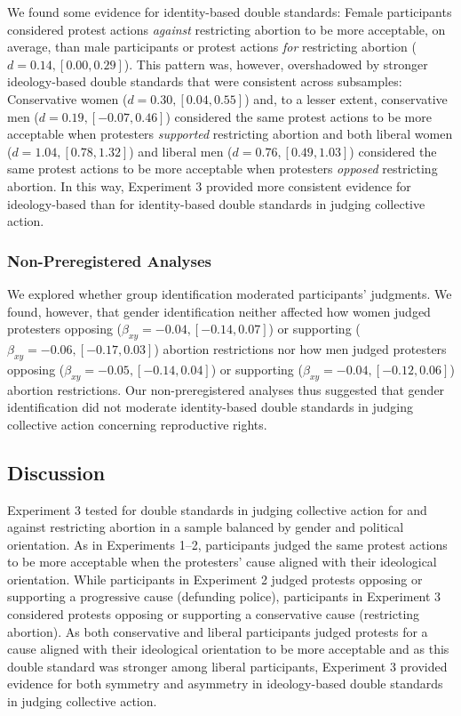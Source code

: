 \documentclass[12pt, letterpaper]{article}
\begin{document}
We found some evidence for identity-based double standards: Female
participants considered protest actions \emph{against} restricting
abortion to be more acceptable, on average, than male participants or
protest actions \emph{for} restricting abortion
(\(d = 0.14, [0.00, 0.29]\)). This pattern was, however, overshadowed by
stronger ideology-based double standards that were consistent across
subsamples: Conservative women (\(d = 0.30, [0.04, 0.55]\)) and, to a
lesser extent, conservative men (\(d = 0.19, [-0.07, 0.46]\)) considered
the same protest actions to be more acceptable when protesters
\emph{supported} restricting abortion and both liberal women
(\(d = 1.04, [0.78, 1.32]\)) and liberal men
(\(d = 0.76, [0.49, 1.03]\)) considered the same protest actions to be
more acceptable when protesters \emph{opposed} restricting abortion. In
this way, Experiment 3 provided more consistent evidence for
ideology-based than for identity-based double standards in judging
collective action.

\hypertarget{non-preregistered-analyses-2}{%
\subsubsection{Non-Preregistered
Analyses}\label{non-preregistered-analyses-2}}

We explored whether group identification moderated participants'
judgments. We found, however, that gender identification neither
affected how women judged protesters opposing
(\(\beta_{xy} = -0.04, [-0.14, 0.07]\)) or supporting
(\(\beta_{xy} = -0.06, [-0.17, 0.03]\)) abortion restrictions nor how
men judged protesters opposing (\(\beta_{xy} = -0.05, [-0.14, 0.04]\))
or supporting (\(\beta_{xy} = -0.04, [-0.12, 0.06]\)) abortion
restrictions. Our non-preregistered analyses thus suggested that gender
identification did not moderate identity-based double standards in
judging collective action concerning reproductive rights.

\hypertarget{discussion-2}{%
\subsection{Discussion}\label{discussion-2}}

Experiment 3 tested for double standards in judging collective action
for and against restricting abortion in a sample balanced by gender and
political orientation. As in Experiments 1--2, participants judged the
same protest actions to be more acceptable when the protesters' cause
aligned with their ideological orientation. While participants in
Experiment 2 judged protests opposing or supporting a progressive cause
(defunding police), participants in Experiment 3 considered protests
opposing or supporting a conservative cause (restricting abortion). As
both conservative and liberal participants judged protests for a cause
aligned with their ideological orientation to be more acceptable and as
this double standard was stronger among liberal participants, Experiment
3 provided evidence for both symmetry and asymmetry in ideology-based
double standards in judging collective action.
\end{document}
